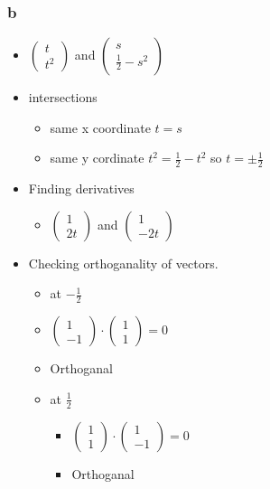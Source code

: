 \documentclass[]{article}
\providecommand{\tightlist}{%
  \setlength{\itemsep}{0pt}\setlength{\parskip}{0pt}}
\begin{document}
\hypertarget{b-1}{%
\subsubsection{b}\label{b-1}}

\begin{itemize}
\tightlist
\item
  \(\begin{pmatrix} t \\ t^2 \end{pmatrix}\) and
  \(\begin{pmatrix} s \\ \frac{1}{2} - s^2 \end{pmatrix}\)
\item
  intersections

  \begin{itemize}
  \tightlist
  \item
    same x coordinate \(t=s\)
  \item
    same y cordinate \(t^2 = \frac{1}{2} - t^2\) so
    \(t = \pm \frac{1}{2}\)
  \end{itemize}
\item
  Finding derivatives

  \begin{itemize}
  \tightlist
  \item
    \(\begin{pmatrix} 1 \\ 2t \end{pmatrix}\) and
    \(\begin{pmatrix} 1 \\ -2t\end{pmatrix}\)
  \end{itemize}
\item
  Checking orthoganality of vectors.

  \begin{itemize}
  \tightlist
  \item
    at \(-\frac{1}{2}\)
  \item
    \(\begin{pmatrix} 1 \\ -1 \end{pmatrix} \cdot \begin{pmatrix} 1 \\ 1 \end{pmatrix} = 0\)
  \item
    Orthoganal
  \item
    at \(\frac{1}{2}\)

    \begin{itemize}
    \tightlist
    \item
      \(\begin{pmatrix} 1 \\ 1 \end{pmatrix} \cdot \begin{pmatrix} 1 \\ -1 \end{pmatrix} = 0\)
    \item
      Orthoganal
    \end{itemize}
  \end{itemize}
\end{itemize}
\end{document}
